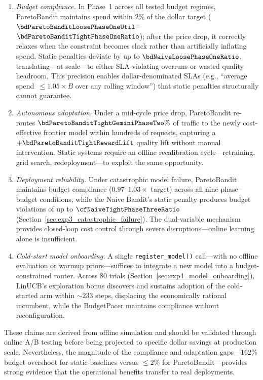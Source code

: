 \begin{enumerate}[nosep,leftmargin=*]
  \item \emph{Budget compliance.}  In Phase~1 across all tested budget regimes, ParetoBandit maintains spend within $2\%$ of the dollar target ($\bdParetoBanditLoosePhaseOneUtil$--$\bdParetoBanditTightPhaseOneRatio$); after the price drop, it correctly relaxes when the constraint becomes slack rather than artificially inflating spend.  Static penalties deviate by up to $\bdNaiveLoosePhaseOneRatio$, translating---at scale---to either SLA-violating overruns or wasted quality headroom.  This precision enables dollar-denominated SLAs (e.g., ``average spend~$\leq 1.05{\times}B$ over any rolling window'') that static penalties structurally cannot guarantee.
  \item \emph{Autonomous adaptation.}  Under a mid-cycle price drop, ParetoBandit re-routes $\bdParetoBanditTightGeminiPhaseTwo\%$ of traffic to the newly cost-effective frontier model within hundreds of requests, capturing a $+\bdParetoBanditTightRewardLift$ quality lift without manual intervention.  Static systems require an offline recalibration cycle---retraining, grid search, redeployment---to exploit the same opportunity.
  \item \emph{Deployment reliability.}  Under catastrophic model failure, ParetoBandit maintains budget compliance ($0.97$--$1.03\times$ target) across all nine phase--budget conditions, while the Naive Bandit's static penalty produces budget violations of up to $\cfNaiveTightPhaseThreeRatio$ (Section~\ref{sec:exp3_catastrophic_failure}).  The dual-variable mechanism provides closed-loop cost control through severe disruptions---online learning alone is insufficient.
  \item \emph{Cold-start model onboarding.}  A single \texttt{register\_model()} call---with no offline evaluation or warmup priors---suffices to integrate a new model into a budget-constrained router.  Across 80 trials (Section~\ref{sec:exp4_model_onboarding}), LinUCB's exploration bonus discovers and sustains adoption of the cold-started arm within ${\sim}233$ steps, displacing the economically rational incumbent, while the BudgetPacer maintains compliance without reconfiguration.
\end{enumerate}
These claims are derived from offline simulation and should be validated through online A/B testing before being projected to specific dollar savings at production scale.  Nevertheless, the magnitude of the compliance and adaptation gaps---$162\%$ budget overshoot for static baselines versus ${\leq}2\%$ for ParetoBandit---provides strong evidence that the operational benefits transfer to real deployments.

